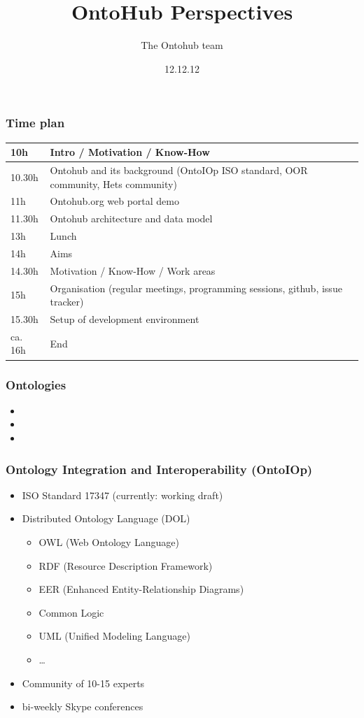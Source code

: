 \documentclass[german]{beamer}
\title{OntoHub Perspectives}
\author{The Ontohub team}
\date{12.12.12}
\begin{document}
\maketitle

\begin{frame}
\frametitle{Time plan}
\begin{tabular}{|l|p{9cm}|}\hline
10h & Intro / Motivation / Know-How\\\hline
10.30h & Ontohub and its background (OntoIOp ISO standard, OOR community, Hets community)\\\hline
11h & Ontohub.org web portal demo\\\hline
11.30h & Ontohub architecture and data model\\\hline
13h & Lunch\\\hline
14h & Aims\\\hline
14.30h & Motivation / Know-How / Work areas\\\hline
15h & Organisation (regular meetings, programming sessions, github, issue tracker)\\\hline
15.30h & Setup of development environment\\\hline
ca. 16h & End\\\hline
\end{tabular}
\end{frame}

\begin{frame}
\frametitle{Ontologies}
\begin{itemize}
\item 
\item 
\item 
\end{itemize}
\end{frame}

\begin{frame}
\frametitle{Ontology Integration and Interoperability (OntoIOp)}
\begin{itemize}
\item ISO Standard 17347 (currently: working draft)
\item Distributed Ontology Language (DOL)
\begin{itemize}
\item OWL (Web Ontology Language)
\item RDF (Resource Description Framework)
\item EER (Enhanced Entity-Relationship Diagrams)
\item Common Logic
\item UML (Unified Modeling Language)
\item \ldots
\end{itemize}
\item Community of 10-15 experts
\item bi-weekly Skype conferences
\end{itemize}
\end{frame}
\end{document}

